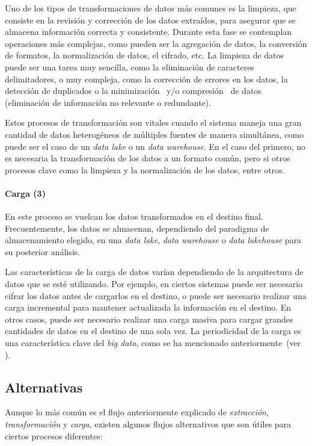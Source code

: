 Uno de los tipos de transformaciones de datos más comunes es la limpieza, que
consiste en la revisión y corrección de los datos extraídos, para asegurar que
se almacena información correcta y consistente. Durante esta fase se contemplan
operaciones más complejas, como pueden ser la agregación de datos, la conversión
de formatos, la normalización de datos, el cifrado, etc. La limpieza de datos
puede ser una tarea muy sencilla, como la eliminación de caracteres
delimitadores, o muy compleja, como la corrección de errores en los datos, la
detección de duplicados o la minimización~\cite{mezmir2020qualitative} y/o
compresión~\cite{lelewer1987data} de datos (eliminación de información no
relevante o redundante).

Estos procesos de transformación son vitales cuando el sistema maneja una gran
cantidad de datos heterogéneos de múltiples fuentes de manera simultánea, como
puede ser el caso de un \textit{data lake} o un \textit{data warehouse}.
En el caso del primero, no es necesaria la transformación de los
datos a un formato común, pero si otros procesos clave como la limpieza y la
normalización de los datos, entre otros.

\paragraph{Carga (3)}
En este proceso se vuelcan los datos transformados en el destino final.
Frecuentemente, los datos se almacenan, dependiendo del paradigma de
almacenamiento elegido, en una \textit{data lake}, \textit{data warehouse} o
\textit{data lakehouse} para su posterior análisis.

Las características de la carga de datos varían dependiendo de la arquitectura
de datos que se esté utilizando. Por ejemplo, en ciertos sistemas puede ser
necesario cifrar los datos antes de cargarlos en el destino, o puede ser
necesario realizar una carga incremental para mantener actualizada la información
en el destino. En otros casos, puede ser necesario realizar una carga masiva
para cargar grandes cantidades de datos en el destino de una sola vez. La
periodicidad de la carga es una característica clave del \textit{big data}, como
se ha mencionado anteriormente~(ver ).


\newpage{}
\subsection{Alternativas}
Aunque lo más común es el flujo anteriormente explicado de \textit{extracción},
\textit{transformación} y \textit{carga}, existen algunos flujos alternativos
que son útiles para ciertos procesos diferentes:

